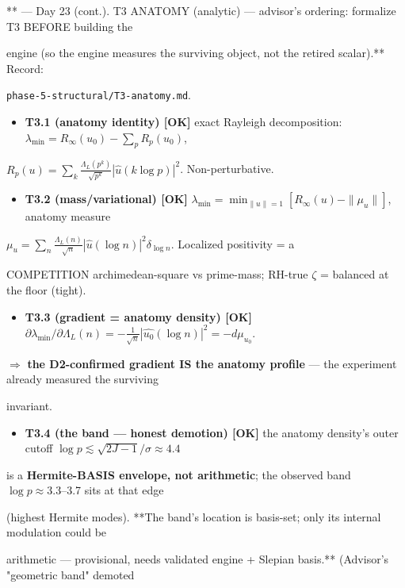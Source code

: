\documentclass[10pt]{article}
\begin{document}
** --- Day 23 (cont.). T3 ANATOMY (analytic) --- advisor's ordering: formalize T3 BEFORE building the\par
engine (so the engine measures the surviving object, not the retired scalar).** Record:\par
\texttt{phase-5-structural/T3-anatomy.md}.\par
\begin{itemize}
\item \textbf{T3.1 (anatomy identity) [OK]} exact Rayleigh decomposition: $\lambda_{\min}=R_\infty(u_0)-\sum_p R_p(u_0)$,
\end{itemize}
  $R_p(u)=\sum_k\frac{\Lambda_L(p^k)}{\sqrt{p^k}}|\widehat u(k\log p)|^2$. Non-perturbative.\par
\begin{itemize}
\item \textbf{T3.2 (mass/variational) [OK]} $\lambda_{\min}=\min_{\|u\|=1}[R_\infty(u)-\|\mu_u\|]$, anatomy measure
\end{itemize}
  $\mu_u=\sum_n\frac{\Lambda_L(n)}{\sqrt n}|\widehat u(\log n)|^2\delta_{\log n}$. Localized positivity = a\par
  COMPETITION archimedean-square vs prime-mass; RH-true \ensuremath{\zeta} = balanced at the floor (tight).\par
\begin{itemize}
\item \textbf{T3.3 (gradient = anatomy density) [OK]} $\partial\lambda_{\min}/\partial\Lambda_L(n)=-\frac1{\sqrt n}|\widehat{u_0}(\log n)|^2=-d\mu_{u_0}$.
\end{itemize}
  \ensuremath{\Rightarrow} \textbf{the D2-confirmed gradient IS the anatomy profile} --- the experiment already measured the surviving\par
  invariant.\par
\begin{itemize}
\item \textbf{T3.4 (the band --- honest demotion) [OK]} the anatomy density's outer cutoff $\log p\lesssim\sqrt{2J-1}/\sigma\approx4.4$
\end{itemize}
  is a \textbf{Hermite-BASIS envelope, not arithmetic}; the observed band $\log p\approx3.3$--3.7 sits at that edge\par
  (highest Hermite modes). **The band's location is basis-set; only its internal modulation could be\par
  arithmetic --- provisional, needs validated engine + Slepian basis.** (Advisor's "geometric band" demoted\par
\end{document}
